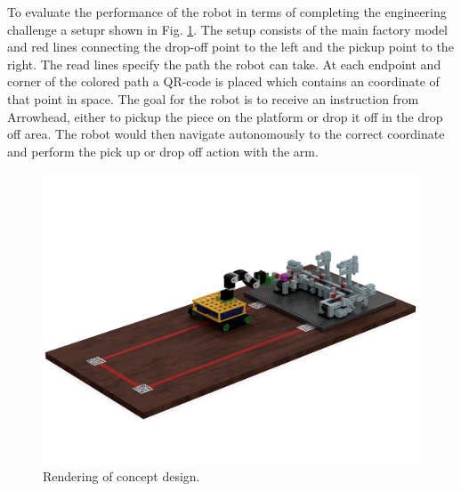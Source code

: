 To evaluate the performance of the robot in terms of completing the engineering challenge a setupr shown in Fig. \ref{fig:factory_setup}. The setup consists of the main factory model and red lines connecting the drop-off point to the left and the pickup point to the right. The read lines specify the path the robot can take. At each endpoint and corner of the colored path a QR-code is placed which contains an coordinate of that point in space. The goal for the robot is to receive an instruction from Arrowhead, either to pickup the piece on the platform or drop it off in the drop off area. The robot would then navigate autonomously to the correct coordinate and perform the pick up or drop off action with the arm. 

\begin{figure}
    \centering
    \includegraphics[width=0.7\columnwidth]{img/evaluation_setup.png}
    \caption{Rendering of concept design.}
    \label{fig:factory_setup}
\end{figure}